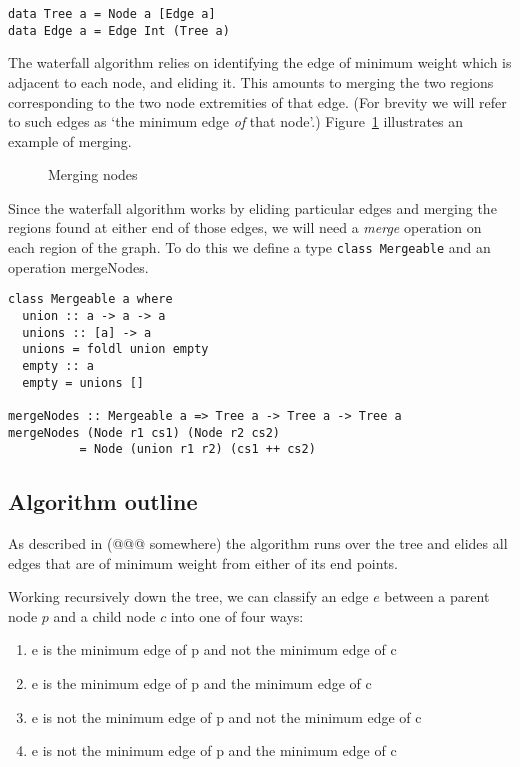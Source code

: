 \documentclass{jfp}
\begin{document}
\begin{verbatim}
data Tree a = Node a [Edge a]
data Edge a = Edge Int (Tree a)
\end{verbatim}


The waterfall algorithm relies on identifying the edge of minimum
weight which is adjacent to each node, and eliding it. This amounts to
merging the two regions corresponding to the two node extremities of
that edge.  (For brevity we will refer to such edges as `the minimum
edge {\em of\/} that node'.) Figure~\ref{fig:merging} illustrates an
example of merging.

\begin{figure}
\centering
\ifpdf
\else
\fi
\caption{Merging nodes}
\label{fig:merging}
\end{figure}

Since the waterfall algorithm works by eliding particular edges and
merging the regions found at either end of those edges, we will need a
{\em merge} operation on each region of the graph. To do this we
define a type {\tt class Mergeable} and an operation mergeNodes.

\begin{verbatim}
class Mergeable a where
  union :: a -> a -> a
  unions :: [a] -> a
  unions = foldl union empty
  empty :: a
  empty = unions []

mergeNodes :: Mergeable a => Tree a -> Tree a -> Tree a
mergeNodes (Node r1 cs1) (Node r2 cs2)
          = Node (union r1 r2) (cs1 ++ cs2)
\end{verbatim}


\subsection{Algorithm outline}

As described in (@@@ somewhere) the algorithm runs over the tree and
elides all edges that are of minimum weight from either of its end
points.

Working recursively down the tree, we can classify an edge $e$ between
a parent node $p$ and a child node $c$ into one of four ways:
\begin{enumerate}[I]
\item e is     the minimum edge of p and not the minimum edge of c
\item e is     the minimum edge of p and     the minimum edge of c
\item e is not the minimum edge of p and not the minimum edge of c
\item e is not the minimum edge of p and     the minimum edge of c
\end{enumerate}
\end{document}
